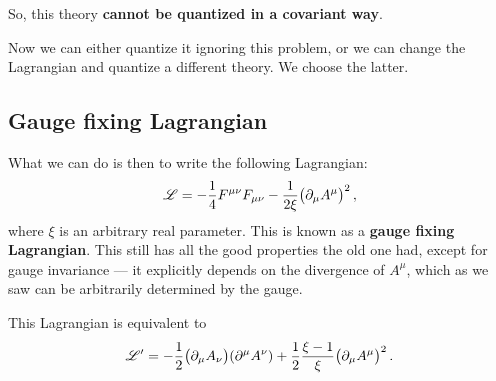 \documentclass[main.tex]{subfiles}
\begin{document}
So, this theory \textbf{cannot be quantized in a covariant way}. 

Now we can either quantize it ignoring this problem, or we can change the Lagrangian and quantize a different theory. We choose the latter. 

\subsection{Gauge fixing Lagrangian}

What we can do is then to write the following Lagrangian: 
%
\begin{align}
\mathscr{L} = - \frac{1}{4} F^{\mu \nu } F_{\mu \nu } - \frac{1}{2 \xi } 
\qty(\partial_{\mu } A^{\mu })^2
\,,
\end{align}
%
where \(\xi \) is an arbitrary real parameter. This is known as a \textbf{gauge fixing Lagrangian}. This still has all the good properties the old one had, except for gauge invariance --- it explicitly depends on the divergence of \(A^{\mu }\), which as we saw can be arbitrarily determined by the gauge. 

\begin{claim}
This Lagrangian is equivalent to 
%
\begin{align}
\mathscr{L}' = - \frac{1}{2} \qty(\partial_{\mu } A_{\nu })\qty(\partial^{\mu }A^{\nu }) + \frac{1}{2} \frac{\xi-1}{\xi } \qty(\partial_{\mu } A^{\mu })^2
\,.
\end{align}
\end{claim}
\end{document}
